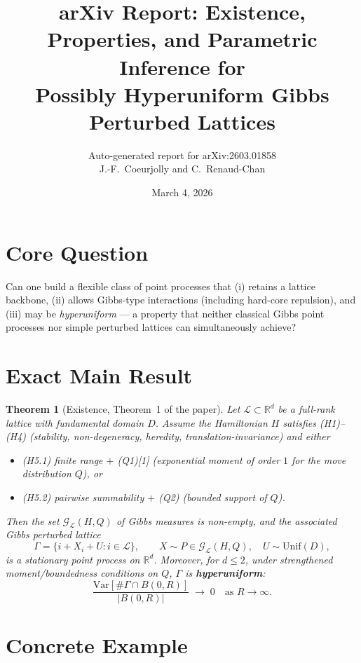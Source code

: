 \documentclass[11pt,a4paper]{article}
\title{arXiv Report: Existence, Properties, and Parametric Inference for\\Possibly Hyperuniform Gibbs Perturbed Lattices}
\author{Auto-generated report for arXiv:2603.01858\\J.-F.\ Coeurjolly and C.\ Renaud-Chan}
\date{March 4, 2026}
\newtheorem{theorem}{Theorem}
\begin{document}
\maketitle

\section{Core Question}

Can one build a flexible class of point processes that (i) retains a lattice backbone, (ii) allows Gibbs-type interactions (including hard-core repulsion), and (iii) may be \emph{hyperuniform} --- a property that neither classical Gibbs point processes nor simple perturbed lattices can simultaneously achieve?

\section{Exact Main Result}

\begin{theorem}[Existence, Theorem~1 of the paper]
Let $\mathcal{L}\subset\mathbb{R}^d$ be a full-rank lattice with fundamental domain $D$.
Assume the Hamiltonian $H$ satisfies \textup{(H1)--(H4)} (stability, non-degeneracy, heredity, translation-invariance) and either
\begin{itemize}[nosep]
  \item \textup{(H5.1)} finite range $+$ \textup{(Q1)[1]} (exponential moment of order $1$ for the move distribution $Q$), or
  \item \textup{(H5.2)} pairwise summability $+$ \textup{(Q2)} (bounded support of $Q$).
\end{itemize}
Then the set $\mathcal{G}_{\mathcal{L}}(H,Q)$ of Gibbs measures is non-empty, and the associated \emph{Gibbs perturbed lattice}
\[
  \Gamma = \{i + X_i + U : i\in\mathcal{L}\}, \qquad X\sim P\in\mathcal{G}_{\mathcal{L}}(H,Q),\quad U\sim\mathrm{Unif}(D),
\]
is a stationary point process on $\mathbb{R}^d$.  Moreover, for $d\le 2$, under strengthened moment/boundedness conditions on $Q$, $\Gamma$ is \textbf{hyperuniform}:
\[
  \frac{\mathrm{Var}[\#\Gamma\cap B(0,R)]}{|B(0,R)|}\;\longrightarrow\;0 \quad\text{as }R\to\infty.
\]
\end{theorem}

\section{Concrete Example}
\end{document}
